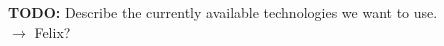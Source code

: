 \textbf{TODO:} Describe the currently available technologies we want to use. \\
$\rightarrow$ Felix?
